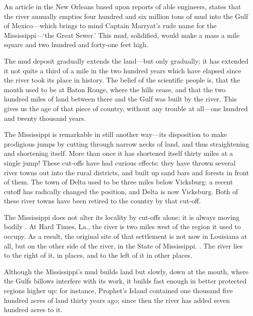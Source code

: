 \documentclass[../interior-demo.tex]{subfiles}
\begin{document}
An article in the New Orleans   based upon reports of
able engineers, states that the river annually empties four hundred and
six million tons of mud into the Gulf of Mexico---which brings to mind
Captain Marryat's rude name for the Mississippi---`the Great Sewer.' This
mud, solidified, would make a mass a mile square and two hundred and
forty-one feet high.

The mud deposit gradually extends the land---but only gradually; it has
extended it not quite a third of a mile in the two hundred years which
have elapsed since the river took its place in history. The belief of
the scientific people is, that the mouth used to be at Baton Rouge,
where the hills cease, and that the two hundred miles of land between
there and the Gulf was built by the river. This gives us the age of that
piece of country, without any trouble at all---one hundred and twenty
thousand years.

The Mississippi is remarkable in still another way---its disposition to
make prodigious jumps by cutting through narrow necks of land, and thus
straightening and shortening itself. More than once it has shortened
itself thirty miles at a single jump! These cut-offs have had curious
effects: they have thrown several river towns out into the rural
districts, and built up sand bars and forests in front of them. The town
of Delta used to be three miles below Vicksburg: a recent cutoff has
radically changed the position, and Delta is now 
Vicksburg. Both of these river towns have been retired to the country by that
cut-off.

The Mississippi does not alter its locality by cut-offs alone: it
is always 
moving bodily . At Hard Times, La., the river is two miles west
of the region it used to occupy. As a result, the original site of that
settlement is not now in Louisiana at all, but on the other side of
the river, in the State of Mississippi. . The river lies to the right of it, in places, and to the
left of it in other places.

Although the Mississippi's mud builds land but slowly, down at the
mouth, where the Gulfs billows interfere with its work, it builds fast
enough in better protected regions higher up: for instance, Prophet's
Island contained one thousand five hundred acres of land thirty years
ago; since then the river has added seven hundred acres to it.
\end{document}
